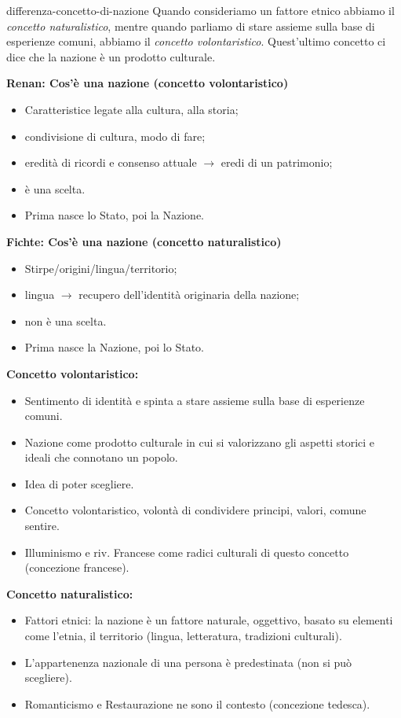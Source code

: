 \documentclass[preview]{standalone}
\begin{document}
\begin{snippet}{differenza-concetto-di-nazione}
    Quando consideriamo un fattore etnico abbiamo il \textit{concetto naturalistico},
    mentre quando parliamo di stare assieme sulla base di esperienze comuni, abbiamo il \textit{concetto volontaristico}.
    Quest'ultimo concetto ci dice che la nazione è un prodotto culturale.

    \textbf{Renan: Cos'è una nazione (concetto volontaristico)}
    \begin{itemize}
        \item Caratteristice legate alla cultura, alla storia;
        \item condivisione di cultura, modo di fare;
        \item eredità di ricordi e consenso attuale \(\rightarrow\) eredi di un patrimonio;
        \item è una scelta.
        \item Prima nasce lo Stato, poi la Nazione.
    \end{itemize}

    \textbf{Fichte: Cos'è una nazione (concetto naturalistico)}
    \begin{itemize}
        \item Stirpe/origini/lingua/territorio;
        \item lingua \(\rightarrow\) recupero dell'identità originaria della nazione;
        \item non è una scelta.
        \item Prima nasce la Nazione, poi lo Stato.
    \end{itemize}

    \textbf{Concetto volontaristico:}
    \begin{itemize}
        \item Sentimento di identità e spinta a stare assieme sulla base di esperienze comuni.
        \item Nazione come prodotto culturale in cui si valorizzano gli aspetti storici e ideali che connotano un popolo.
        \item Idea di poter scegliere.
        \item Concetto volontaristico, volontà di condividere principi, valori, comune sentire.
        \item Illuminismo e riv. Francese come radici culturali di questo concetto (concezione francese).
    \end{itemize}

    \textbf{Concetto naturalistico:}
    \begin{itemize}
        \item Fattori etnici: la nazione è un fattore naturale, oggettivo, basato su elementi come l'etnia, il territorio (lingua, letteratura, tradizioni culturali).
        \item L'appartenenza nazionale di una persona è predestinata (non si può scegliere).
        \item Romanticismo e Restaurazione ne sono il contesto (concezione tedesca).
    \end{itemize}
\end{snippet}
\end{document}
